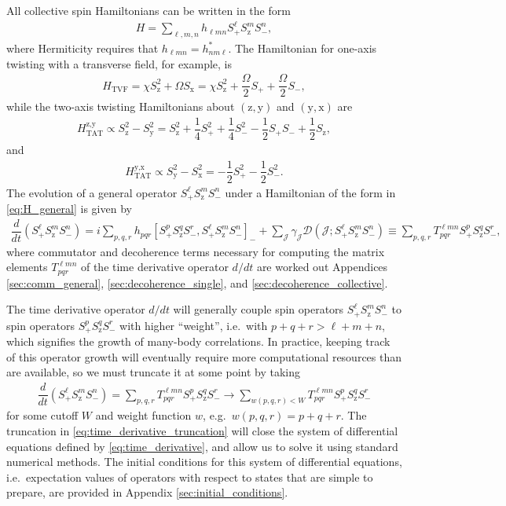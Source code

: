 \documentclass[aps,notitlepage,nofootinbib,11pt]{revtex4-1}
\renewcommand{\t}{\text} %
\newcommand{\f}[2]{\dfrac{#1}{#2}} %
\newcommand{\p}[1]{\left(#1\right)} %
\renewcommand{\sp}[1]{\left[#1\right]} %
\newcommand{\D}{\mathcal{D}}
\newcommand{\J}{\mathcal{J}}
\newcommand{\z}{\text{z}}
\newcommand{\x}{\text{x}}
\newcommand{\y}{\text{y}}
\newcommand{\1}{\mathds{1}}
\begin{document}
All collective spin Hamiltonians can be written in the form
\begin{align}
  H = \sum_{\ell,m,n} h_{\ell mn} S_+^\ell S_\z^m S_-^n,
  \label{eq:H_general}
\end{align}
where Hermiticity requires that $h_{\ell mn}=h_{nm\ell}^*$.  The
Hamiltonian for one-axis twisting with a transverse field, for
example, is
\begin{align}
  H_{\t{TVF}}
  = \chi S_\z^2 + \Omega S_\x
  = \chi S_\z^2 + \f{\Omega}{2} S_+ + \f{\Omega}{2} S_-,
\end{align}
while the two-axis twisting Hamiltonians about $\p{\z,\y}$ and
$\p{\y,\x}$ are
\begin{align}
  H_{\t{TAT}}^{\z,\y}
  \propto S_\z^2 - S_\y^2
  = S_\z^2 + \f14 S_+^2 + \f14 S_-^2
  - \f12 S_+ S_- + \f12 S_\z,
\end{align}
and
\begin{align}
  H_{\t{TAT}}^{\y,\x}
  \propto S_\y^2 - S_\x^2
  = -\f12 S_+^2 - \f12 S_-^2.
\end{align}
The evolution of a general operator $S_+^\ell S_\z^m S_-^n$ under a
Hamiltonian of the form in \eqref{eq:H_general} is given by
\begin{align}
  \f{d}{dt} \p{S_+^\ell S_\z^m S_-^n}
  = i \sum_{p,q,r} h_{pqr}
  \sp{S_+^p S_\z^q S_-^r, S_+^\ell S_\z^m S_-^n}_-
  + \sum_\J \gamma_\J \D\p{\J; S_+^\ell S_\z^m S_-^n}
  \equiv \sum_{p,q,r} T^{\ell m n}_{pqr} S_+^p S_\z^q S_-^r,
  \label{eq:time_derivative}
\end{align}
where commutator and decoherence terms necessary for computing the
matrix elements $T^{\ell m n}_{pqr}$ of the time derivative operator
$d/dt$ are worked out Appendices \ref{sec:comm_general},
\ref{sec:decoherence_single}, and \ref{sec:decoherence_collective}.

The time derivative operator $d/dt$ will generally couple spin
operators $S_+^\ell S_\z^m S_-^n$ to spin operators
$S_+^p S_\z^q S_-^r$ with higher ``weight'', i.e.~with
$p+q+r>\ell+m+n$, which signifies the growth of many-body
correlations.  In practice, keeping track of this operator growth will
eventually require more computational resources than are available, so
we must truncate it at some point by taking
\begin{align}
  \f{d}{dt} \p{S_+^\ell S_\z^m S_-^n}
  = \sum_{p,q,r} T^{\ell m n}_{pqr} S_+^p S_\z^q S_-^r
  \to \sum_{w\p{p,q,r}<W} T^{\ell m n}_{pqr} S_+^p S_\z^q S_-^r
  \label{eq:time_derivative_truncation}
\end{align}
for some cutoff $W$ and weight function $w$, e.g.~$w\p{p,q,r}=p+q+r$.
The truncation in \eqref{eq:time_derivative_truncation} will close the
system of differential equations defined by
\eqref{eq:time_derivative}, and allow us to solve it using standard
numerical methods.  The initial conditions for this system of
differential equations, i.e.~expectation values of operators with
respect to states that are simple to prepare, are provided in Appendix
\ref{sec:initial_conditions}.
\end{document}
